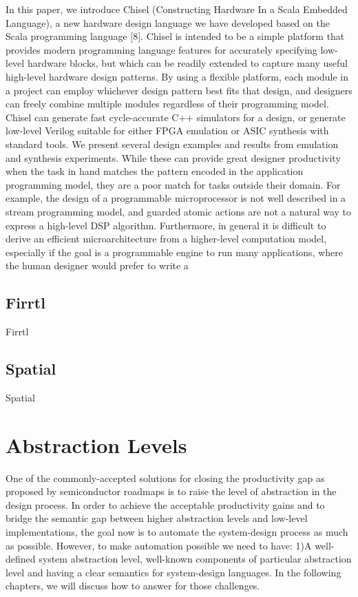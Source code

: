 In this paper, we introduce Chisel (Constructing Hardware In a Scala Embedded Language), a new hardware design language we have developed based on the Scala programming language [8]. Chisel is intended to be a simple
platform that provides modern programming language features for accurately specifying low-level hardware blocks,
but which can be readily extended to capture many useful high-level hardware design patterns. By using a flexible
platform, each module in a project can employ whichever
design pattern best fits that design, and designers can freely
combine multiple modules regardless of their programming
model. Chisel can generate fast cycle-accurate C++ simulators for a design, or generate low-level Verilog suitable for
either FPGA emulation or ASIC synthesis with standard
tools. We present several design examples and results from
emulation and synthesis experiments.
While these can provide great designer productivity when
the task in hand matches the pattern encoded in the application programming model, they are a poor match for tasks
outside their domain. For example, the design of a programmable microprocessor is not well described in a stream
programming model, and guarded atomic actions are not a
natural way to express a high-level DSP algorithm. Furthermore, in general it is difficult to derive an efficient microarchitecture from a higher-level computation model, especially
if the goal is a programmable engine to run many applications, where the human designer would prefer to write a

\subsection{Firrtl}
Firrtl~\cite{izraelevitz_2017_firrtl_reusability, firrtl}


\subsection{Spatial}
Spatial~\cite{david_PLDI_2018_spatial, prabhakar_asplos_2016_parallelpattern}



\section{Abstraction Levels}

One of the commonly-accepted solutions for closing the productivity gap as
proposed by semiconductor roadmaps is to raise the level of abstraction in the design process. In order to achieve the acceptable productivity gains
and to bridge the semantic gap between higher abstraction levels and low-level
implementations, the goal now is to automate the system-design process as
much as possible. 
However, to make automation possible we need to have: 1)A well-defined system abstraction level, well-known components of particular abstraction level and having a clear semantics for system-design languages.
In the following chapters, we will discuss how to answer for those challenges.

